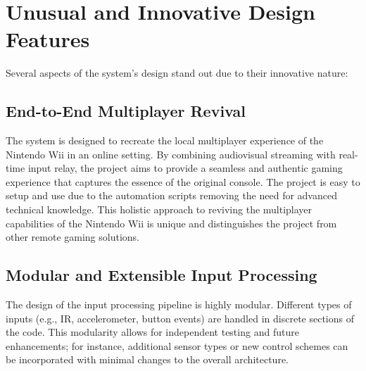 \section{Unusual and Innovative Design Features}

Several aspects of the system’s design stand out due to their innovative nature:

\subsection{End-to-End Multiplayer Revival}

The system is designed to recreate the local multiplayer experience of the Nintendo Wii in an online setting. By combining audiovisual streaming with real-time input relay, the project aims to provide a seamless and authentic gaming experience that captures the essence of the original console. The project is easy to setup and use due to the automation scripts removing the need for advanced technical knowledge. This holistic approach to reviving the multiplayer capabilities of the Nintendo Wii is unique and distinguishes the project from other remote gaming solutions.




\subsection{Modular and Extensible Input Processing}

The design of the input processing pipeline is highly modular. Different types of inputs (e.g., IR, accelerometer, button events) are handled in discrete sections of the code. This modularity allows for independent testing and future enhancements; for instance, additional sensor types or new control schemes can be incorporated with minimal changes to the overall architecture.

